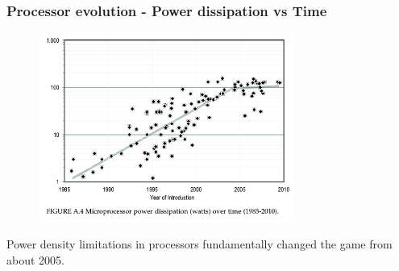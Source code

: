 \begin{frame}
\frametitle{Processor evolution - Power dissipation vs Time}

\begin{figure}[htbp]
\begin{center}
\includegraphics[width=0.75\textwidth]{images/moore1.png}
\end{center}
\end{figure}

\small{Power density limitations in processors fundamentally changed the game from about 2005.}

\end{frame}


